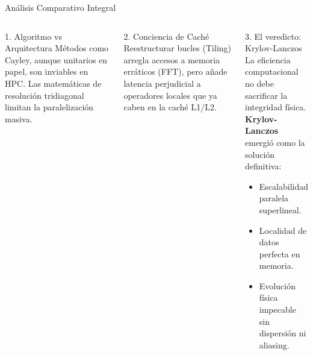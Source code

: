 \documentclass[aspectratio=169,10pt,xcolor=table]{beamer}
\begin{document}
\begin{frame}{Análisis Comparativo Integral}
  \begin{columns}[t]
      \begin{block}{1. Algoritmo vs Arquitectura}
        Métodos como Cayley, aunque unitarios en papel, son inviables en HPC. Las matemáticas de resolución tridiagonal limitan la paralelización masiva.
      \end{block}
      \begin{block}{2. Conciencia de Caché}
        Reestructurar bucles (Tiling) arregla accesos a memoria erráticos (FFT), pero añade latencia perjudicial a operadores locales que ya caben en la caché L1/L2.
      \end{block}
      \begin{exampleblock}{3. El veredicto: Krylov-Lanczos}
        La eficiencia computacional no debe sacrificar la integridad física.\\
        \vspace{0.2cm}
        \textbf{Krylov-Lanczos} emergió como la solución definitiva:
        \begin{itemize}
            \item Escalabilidad paralela superlineal.
            \item Localidad de datos perfecta en memoria.
            \item Evolución física impecable sin dispersión ni aliasing.
        \end{itemize}
      \end{exampleblock}
  \end{columns}
  
  \vspace{0.3cm}
  \begin{center}
  \end{center}
\end{frame}
\end{document}
